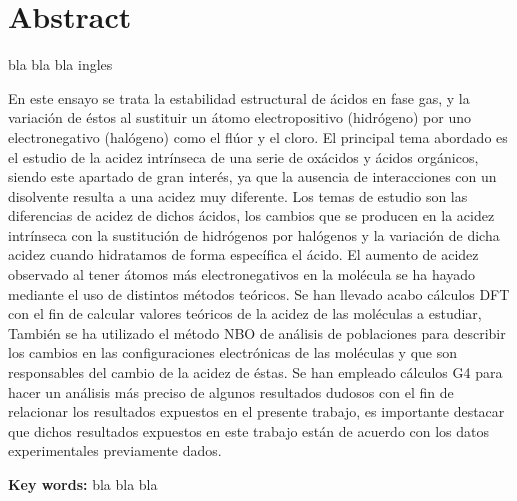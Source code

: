 
\chapter*{Abstract} 


   bla bla bla ingles

En este ensayo se trata la estabilidad estructural de ácidos en fase gas, y la variación de éstos al sustituir un átomo electropositivo (hidrógeno) por uno electronegativo (halógeno) como el flúor y el cloro. El principal tema abordado es el estudio de la acidez intrínseca de una serie de oxácidos y ácidos orgánicos, siendo este apartado de gran interés, ya que la ausencia de interacciones con un disolvente resulta a una acidez muy diferente.
 Los temas de estudio son las diferencias de acidez de dichos ácidos, los cambios que se producen en la acidez intrínseca con la sustitución de hidrógenos por halógenos y la variación de dicha acidez cuando hidratamos de forma específica el ácido. El aumento de acidez observado al tener átomos más electronegativos en la molécula se ha hayado mediante el uso de distintos métodos teóricos. Se han llevado acabo cálculos DFT con el fin de calcular valores teóricos de la acidez de las moléculas a estudiar, También se ha utilizado el método NBO de análisis de poblaciones para describir los cambios en las configuraciones electrónicas de las moléculas y que son responsables del cambio de la acidez de éstas. Se han empleado cálculos G4 para hacer un análisis más preciso de algunos resultados dudosos con el fin de relacionar los resultados expuestos en el presente trabajo, es importante destacar que dichos resultados expuestos en este trabajo están de acuerdo con los datos experimentales previamente dados.


\vspace{5mm}
\textbf{Key words:} bla bla bla